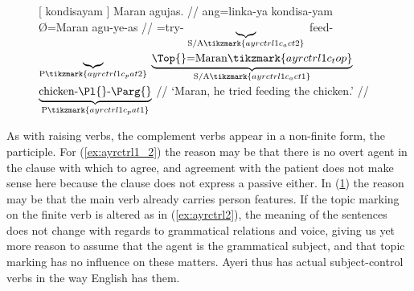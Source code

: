 \begin{figure}
\a\label{ex:ayrctrl1_3}\begingl[aboveglcskip=1.5em, aboveglftskip=2.5em]
	 \textup{[} {} kondisayam {} \textup{]}
		Maran agujas. //
	\glb ang=linka-ya {} {} kondisa-yam {} {} Ø=Maran agu-ye-as //
	\glc \AgtT{}=try-\TsgM{}%
		{}
		$\underbrace{}_{\text{S/A}%
			\tikzmark{ayrctrl1c_act2}%
		}$
		feed-\Ptcp{}
		$\underbrace{}_{\text{P}%
			\tikzmark{ayrctrl1c_pat2}%
		}$
		{}
		$\underbrace{\text{\Top{}=Maran}%
			\tikzmark{ayrctrl1c_top}%
		}_{\text{S/A}%
			\tikzmark{ayrctrl1c_act1}%
		}$
		$\underbrace{\text{chicken-\Pl{}-\Parg{}}}_{\text{P}%
			\tikzmark{ayrctrl1c_pat1}%
		}$
		//
	\glft `Maran, he tried feeding the chicken.' //
\endgl
{}

\xe
\end{figure}

As with raising verbs, the complement verbs appear in a non-finite form, the
participle. For (\ref{ex:ayrctrl1_2}) the reason may be that there is no overt
agent in the clause with which to agree, and agreement with the patient does
not make sense here because the clause does not express a passive either. In
(\ref{ex:ayrctrl1_3}) the reason may be that the main verb already carries
person features. If the topic marking on the finite verb is altered as in
(\ref{ex:ayrctrl2}), the meaning of the sentences does not change with regards
to grammatical relations and voice, giving us yet more reason to assume that
the agent is the grammatical subject, and that topic marking has no influence
on these matters. Ayeri thus has actual subject-control verbs in the way
English has them.

